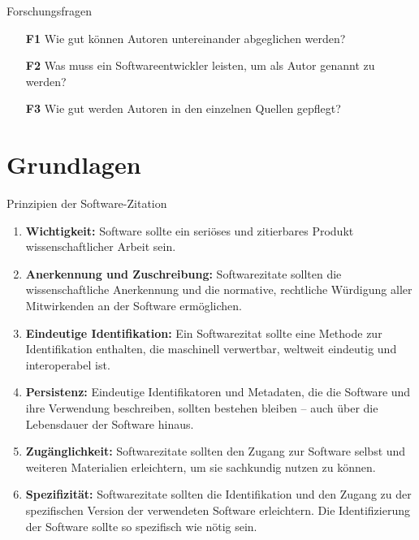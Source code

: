 \documentclass[%
    handout,
    aspectratio=1610,
    10pt,
    onlytextwidth, %
]{beamer}
\begin{document}
\begin{frame}{\secname}{Forschungsfragen}
    \begin{itemize}
      \item[\textcolor{links}{\textbf{F1}}] Wie gut können Autoren untereinander abgeglichen werden?
      \item[\textcolor{links}{\textbf{F2}}] Was muss ein Softwareentwickler leisten, um als Autor genannt zu werden?
      \item[\textcolor{links}{\textbf{F3}}] Wie gut werden Autoren in den einzelnen Quellen gepflegt?
    \end{itemize}
\end{frame}

\section{Grundlagen}

\begin{frame}{\secname}{Prinzipien der Software-Zitation \autocite{smith_software_2016}}
    \begin{enumerate}
        \item \textcolor{links}{\textbf{Wichtigkeit:}} Software sollte ein seriöses und zitierbares Produkt wissenschaftlicher Arbeit sein.
        \item \textcolor{links}{\textbf{Anerkennung und Zuschreibung:}} Softwarezitate sollten die wissenschaftliche Anerkennung und die normative, rechtliche Würdigung aller Mitwirkenden an der Software ermöglichen.
        \item \textcolor{links}{\textbf{Eindeutige Identifikation:}} Ein Softwarezitat sollte eine Methode zur Identifikation enthalten, die maschinell verwertbar, weltweit eindeutig und interoperabel ist.
        \item \textcolor{links}{\textbf{Persistenz:}} Eindeutige Identifikatoren und Metadaten, die die Software und ihre Verwendung beschreiben, sollten bestehen bleiben – auch über die Lebensdauer der Software hinaus.
        \item \textcolor{links}{\textbf{Zugänglichkeit:}} Softwarezitate sollten den Zugang zur Software selbst und weiteren Materialien erleichtern, um sie sachkundig nutzen zu können.
        \item \textcolor{links}{\textbf{Spezifizität:}} Softwarezitate sollten die Identifikation und den Zugang zu der spezifischen Version der verwendeten Software erleichtern. Die Identifizierung der Software sollte so spezifisch wie nötig sein.
    \end{enumerate}
\end{frame}
\end{document}
